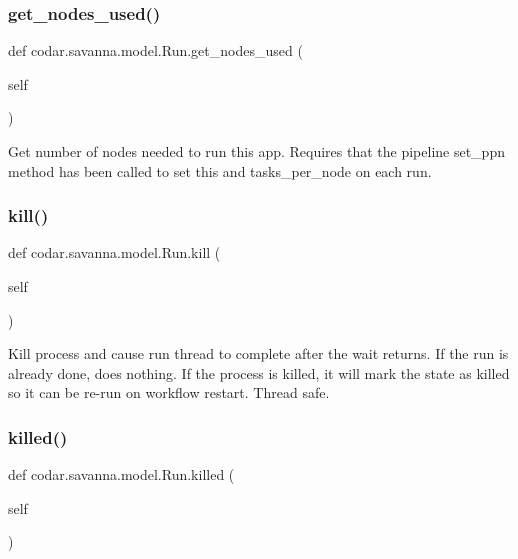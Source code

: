 \subsubsection{\texorpdfstring{get\+\_\+nodes\+\_\+used()}{get\_nodes\_used()}}
{\footnotesize\ttfamily def codar.\+savanna.\+model.\+Run.\+get\+\_\+nodes\+\_\+used (\begin{DoxyParamCaption}\item[{}]{self }\end{DoxyParamCaption})}

\begin{DoxyVerb}Get number of nodes needed to run this app. Requires that the
pipeline set_ppn method has been called to set this and tasks_per_node
on each run.\end{DoxyVerb}
 \mbox{\label{classcodar_1_1savanna_1_1model_1_1_run_a734d77c85281aa6b2d76ec798575c52b}} 
\subsubsection{\texorpdfstring{kill()}{kill()}}
{\footnotesize\ttfamily def codar.\+savanna.\+model.\+Run.\+kill (\begin{DoxyParamCaption}\item[{}]{self }\end{DoxyParamCaption})}

\begin{DoxyVerb}Kill process and cause run thread to complete after the wait
returns. If the run is already done, does nothing. If the process is
killed, it will mark the state as killed so it can be re-run on
workflow restart. Thread safe.\end{DoxyVerb}
 \mbox{\label{classcodar_1_1savanna_1_1model_1_1_run_abf7413759a4e4d456e978e5bade25e02}} 
\subsubsection{\texorpdfstring{killed()}{killed()}}
{\footnotesize\ttfamily def codar.\+savanna.\+model.\+Run.\+killed (\begin{DoxyParamCaption}\item[{}]{self }\end{DoxyParamCaption})}

